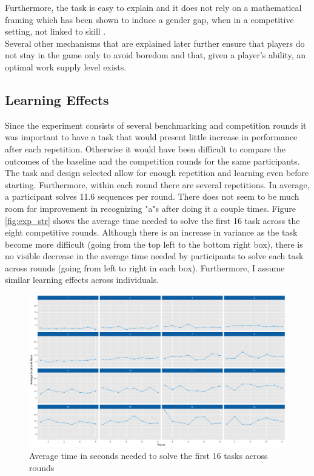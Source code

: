     Furthermore, the task is easy to explain and it does not rely on a mathematical framing which has been shown to induce a gender gap, when in a competitive setting, not linked to skill \citep{niederle2010}.\\
    
    Several other mechanisms that are explained later further ensure that players do not stay in the game only to avoid boredom and that, given a player's ability, an optimal work supply level exists.
    
    \subsection{Learning Effects}
    Since the experiment consists of several benchmarking and competition rounds it was important to have a task that would present little increase in performance after each repetition. Otherwise it would have been difficult to compare the outcomes of the baseline and the competition rounds for the same participants.\\
    
    The task and design selected allow for enough repetition and learning even before starting. Furthermore, within each round there are several repetitions. In average, a participant solves 11.6 sequences per round. There does not seem to be much room for improvement in recognizing "a"s after doing it a couple times. Figure \ref{fig:exp_str} shows the average time needed to solve the first 16 task across the eight competitive rounds. Although there is an increase in variance as the task become more difficult (going from the top left to the bottom right box), there is no visible decrease in the average time needed by participants to solve each task across rounds (going from left to right in each box). Furthermore, I assume similar learning effects across individuals.
    
    \begin{figure}[h]
        \centering
        \includegraphics[width=\textwidth]{graphs/avg_time_per_task_round.png}
        \caption{Average time in seconds needed to solve the first 16 tasks across rounds}
        \label{fig:avg_time_task}
    \end{figure}
    
